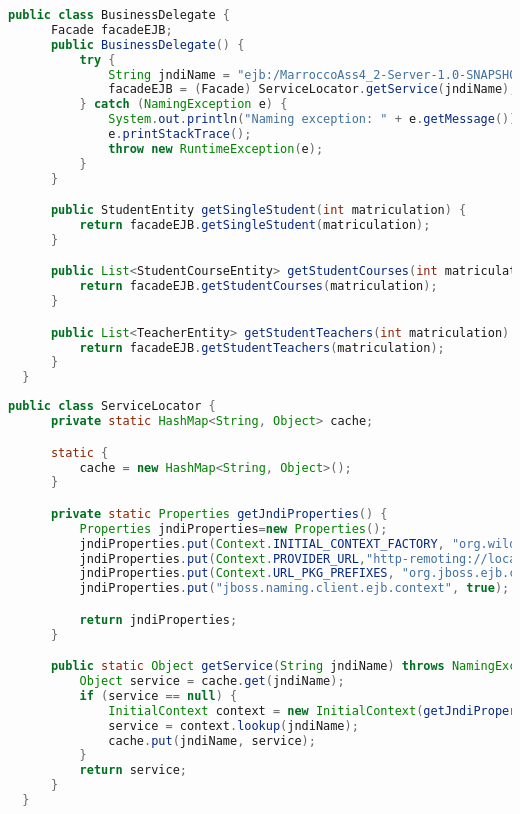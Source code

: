 \pagebreak
\begin{lstlisting}[language=java, caption={BusinessDelegate}]
  public class BusinessDelegate {
      Facade facadeEJB;
      public BusinessDelegate() {
          try {
              String jndiName = "ejb:/MarroccoAss4_2-Server-1.0-SNAPSHOT/FacadeEJB!it.marrocco.marroccoass4_2server.ejb.Facade";
              facadeEJB = (Facade) ServiceLocator.getService(jndiName);
          } catch (NamingException e) {
              System.out.println("Naming exception: " + e.getMessage());
              e.printStackTrace();
              throw new RuntimeException(e);
          }
      }

      public StudentEntity getSingleStudent(int matriculation) {
          return facadeEJB.getSingleStudent(matriculation);
      }

      public List<StudentCourseEntity> getStudentCourses(int matriculation) {
          return facadeEJB.getStudentCourses(matriculation);
      }

      public List<TeacherEntity> getStudentTeachers(int matriculation) {
          return facadeEJB.getStudentTeachers(matriculation);
      }
  }
\end{lstlisting}

\pagebreak
\begin{lstlisting}[language=java, caption={Client ServiceLocator}]
  public class ServiceLocator {
      private static HashMap<String, Object> cache;

      static {
          cache = new HashMap<String, Object>();
      }

      private static Properties getJndiProperties() {
          Properties jndiProperties=new Properties();
          jndiProperties.put(Context.INITIAL_CONTEXT_FACTORY, "org.wildfly.naming.client.WildFlyInitialContextFactory");
          jndiProperties.put(Context.PROVIDER_URL,"http-remoting://localhost:8080");
          jndiProperties.put(Context.URL_PKG_PREFIXES, "org.jboss.ejb.client.naming");
          jndiProperties.put("jboss.naming.client.ejb.context", true);

          return jndiProperties;
      }

      public static Object getService(String jndiName) throws NamingException {
          Object service = cache.get(jndiName);
          if (service == null) {
              InitialContext context = new InitialContext(getJndiProperties());
              service = context.lookup(jndiName);
              cache.put(jndiName, service);
          }
          return service;
      }
  }
\end{lstlisting}

